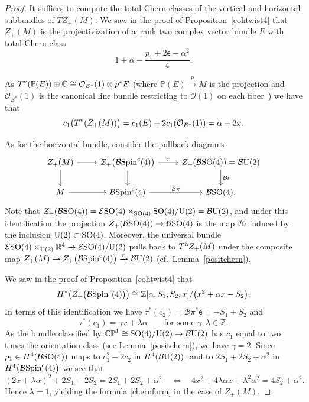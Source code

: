 \documentclass[pdftex]{sigma}%
\newcommand{\R}{\mathbb{R}}
\newcommand{\CP}{\mathbb{CP}}
\newcommand{\Z}{\mathbb{Z}}
\newcommand{\C}{\mathbb{C}}
\numberwithin{equation}{section}
\begin{document}
\begin{proof}
It suffices to compute the total Chern classes of the vertical and horizontal subbundles of $T Z_{\pm}(M)$. We saw in the proof of Proposition~\ref{cohtwist4} that $Z_\pm(M)$ is the projectivization
of a~rank two complex vector bundle $E$ with total Chern class
\[
1+ \alpha - \frac{p_1 \pm 2\mathsf{e} - \alpha^2}{4}.
\]

As $T^{\rm v}(\mathbb{P}(E))\oplus \C \cong \mathcal{O}_{E^*}(1) \otimes p^*E$ (where $\mathbb{P}(E) \xrightarrow{p} M$ is the projection and $\mathcal{O}_{E^*}(1)$
is the canonical line bundle restricting to $\mathcal{O}(1)$ on each fiber~\cite[Definition~15.13]{D12}) we
have that
\[
c_1\big(T^{\rm v}(Z_\pm(M))\big) = c_1(E) + 2 c_1(\mathcal{O}_{E^*}(1)) = \alpha + 2x.
\]

As for the horizontal bundle, consider the pullback diagrams
\[
\begin{tikzcd}
Z_+(M) \ar[r] \ar[d] & Z_+\big({\mathcal B}{\rm Spin}^{\rm c}(4)\big) \ar[r,"\tau"] \ar[d] & Z_+({\mathcal B}{\rm SO}(4))={\mathcal B}{\rm U}(2)
\ar[d,"{\mathcal B}\iota"] \\
M \ar[r] & {\mathcal B}{\rm Spin}^{\rm c}(4) \ar[r,"{\mathcal B}\pi"] & {\mathcal B}{\rm SO}(4).
\end{tikzcd}
\]
Note that $Z_+({\mathcal B}{\rm SO}(4))= {\mathcal E}{\rm SO}(4) \times_{{\rm SO}(4)} {\rm SO}(4)/{\rm U}(2)={\mathcal B}{\rm U}(2)$, and under this identification the projection $Z_+({\mathcal B}{\rm SO}(4)) \to {\mathcal B}{\rm SO}(4)$ is the map ${\mathcal B}\iota$ induced by the inclusion ${\rm U}(2) \subset {\rm SO}(4)$. Moreover, the universal bundle ${\mathcal E}{\rm SO}(4) \times_{{\rm U}(2)} \R^4 \to {\mathcal E}{\rm SO}(4)/{\rm U}(2)$
pulls back to $T^{\rm h} Z_+(M)$ under the composite map $Z_+(M) \to Z_+\big({\mathcal B}{\rm Spin}^{\rm c}(4)\big) \xrightarrow{\tau} {\mathcal B}{\rm U}(2)$ (cf.\ Lemma~\ref{positchern}).

We saw in the proof of Proposition~\ref{cohtwist4} that
\[
H^*\big(Z_+\big({\mathcal B}{\rm Spin}^{\rm c}(4)\big)\big)\cong \Z[\alpha,S_1,S_2,x]/\big(x^2+\alpha x - S_2\big).
\]
In terms of this identification we have $\tau^*(c_2)={\mathcal B}\pi^*\mathsf{e} = -S_1+S_2$
and
\[
\tau^*(c_1) = \gamma x+\lambda \alpha \qquad \text{for some } \gamma, \lambda \in \Z.
\]
As the bundle classified by $\CP^1 \cong {\rm SO}(4)/{\rm U}(2) \to {\mathcal B}{\rm U}(2)$ has $c_1$ equal to two times the orientation class (see Lemma~\ref{positchern}), we have $\gamma=2$.
Since $p_1\in H^4({\mathcal B}{\rm SO}(4))$ maps to $c_1^2-2c_2$ in $H^4({\mathcal B}{\rm U}(2))$, and to $2S_1+2S_2 + \alpha^2$ in $H^4\big({\mathcal B}{\rm Spin}^{\rm c}(4)\big)$ we see that
\[
(2x+\lambda \alpha)^2 +2S_1-2S_2 = 2S_1+2S_2+ \alpha^2 \quad \Leftrightarrow \quad 4x^2 + 4\lambda \alpha x + \lambda^2 \alpha^2 = 4S_2+\alpha^2.
\]
Hence $\lambda=1$, yielding the formula \eqref{chernform} in the case of $Z_+(M)$.


\end{proof}
\end{document}
